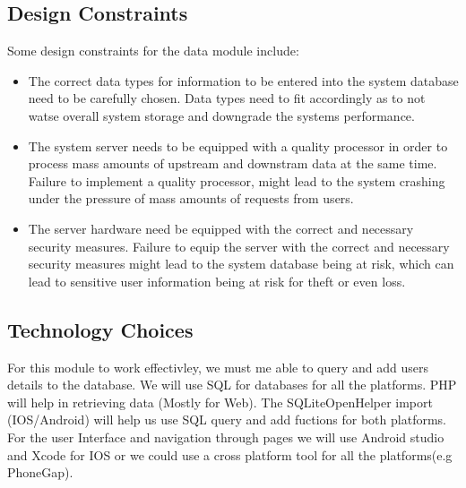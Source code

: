 \documentclass[a4paper, 12pt, one column]{article}
\begin{document}
        
\subsection{Design Constraints}
Some design constraints for the data module include:
  \begin{itemize}

      \item The correct data types for information to be entered into the system database need to be carefully chosen. 
    Data types need to fit accordingly as to not watse overall system storage and downgrade the systems performance.

      \item The system server needs to be equipped with a quality processor in order to process mass amounts of upstream and downstram data at the same time.
    Failure to implement a quality processor, might lead to the system crashing under the pressure of mass amounts of requests from users.

    \item The server hardware need be equipped with the correct and necessary security measures.
    Failure to equip the server with the correct and necessary security measures might lead to the system database being at risk,
    which can lead to sensitive user information being at risk for theft or even loss.

  \end{itemize}
  

\subsection{Technology Choices}

For this module to work effectivley, we must me able to query and add users details to the database. We will use SQL for databases for all the platforms. PHP will help in retrieving data (Mostly for Web). The SQLiteOpenHelper import (IOS/Android) will help us use SQL query and add fuctions for both platforms.
For the user Interface and navigation through pages we will use Android studio and Xcode for IOS or we could use a cross platform tool for all the platforms(e.g PhoneGap). 
\end{document}
